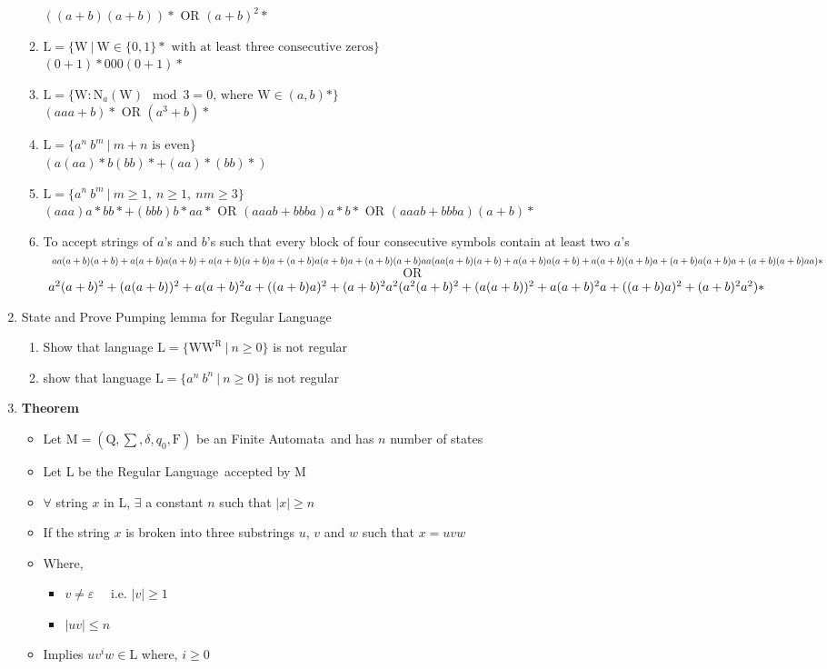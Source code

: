 \documentclass{article}
\def \answer {\item [$\rightarrow$]}
\def \RL {Regular Language~}
\def \FA {Finite Automata~}
\begin{document}
\begin{enumerate}[label=\arabic*)]
\begin{enumerate}[label=\alph*)]
					$((a+b)(a+b))\ast$ OR $(a+b)^2\ast$
				\item $\text{L} = \{\text{W}~|~\text{W} \in \{0,1\} \ast
					\text{ with at least three consecutive zeros}\}$ \\
					$(0+1)\ast000(0+1)\ast$
				\item $\text{L} = \{\text{W} : \text{N}_a(\text{W}) \mod 3=0
					\text{, where } \text{W} \in (a,b) \ast\}$ \\
					$(aaa+b)\ast$ OR $(a^3+b)\ast$
				\item $\text{L} = \{a^n\ b^m~|~m+n \text{ is even}\}$ \\
					$(a(aa)\ast b(bb)\ast+(aa)\ast(bb)\ast)$
				\item $\text{L} = \{a^n\ b^m~|~m \ge 1,~n \ge 1,~nm \ge 3\}$ \\
					$(aaa)a\ast bb\ast+(bbb)b\ast aa\ast$ OR $(aaab+bbba)a\ast b\ast$ OR $(aaab+bbba)(a+b)\ast$
				\item To accept strings of $a$'s and $b$'s such that every block of four consecutive symbols
					contain at least two $a$'s \\
					$~~aa(a+b)(a+b)+a(a+b)a(a+b)+a(a+b)(a+b)a+(a+b)a(a+b)a+(a+b)(a+b)aa \\
					(aa(a+b)(a+b)+a(a+b)a(a+b)+a(a+b)(a+b)a+(a+b)a(a+b)a+(a+b)(a+b)aa)*$
						$$\text{OR}$$
					$~a^2(a+b)^2+(a(a+b))^2+a(a+b)^2a+((a+b)a)^2+(a+b)^2a^2 \\
					(a^2(a+b)^2+(a(a+b))^2+a(a+b)^2a+((a+b)a)^2+(a+b)^2a^2)*$
			\end{enumerate} \newpage
		
		\item State and Prove Pumping lemma for \RL 
		\begin{enumerate}[label=\roman*)]
			\item Show that language $\text{L}= \{\text{W}\text{W}^\text{R}~|~n \ge 0\}$ is not regular
			\item show that language $\text{L}= \{a^n\ b^n~|~n \ge 0\}$ is not regular
		\end{enumerate}
		\answer \textbf{Theorem}
			\begin{itemize}
				\item Let $\text{M}=(\text{Q},\sum,\delta,q_0,\text{F})$ be an \FA and has $n$ number of states
				\item Let L be the \RL accepted by M
				\item $\forall$ string $x$ in L, $\exists$ a constant $n$ such that $|x|\ge n$
				\item If the string $x$ is broken into three substrings $u$, $v$ and $w$ such that $x=uvw$
				\item Where,
				\begin{itemize}
					\item $v\ne\varepsilon$ ~~i.e. $|v|\ge1$
					\item $|uv|\le n$
				\end{itemize}
				\item Implies $uv^iw\in \text{L}$ where, $i\ge0$
			\end{itemize}


\end{enumerate}
\end{document}
